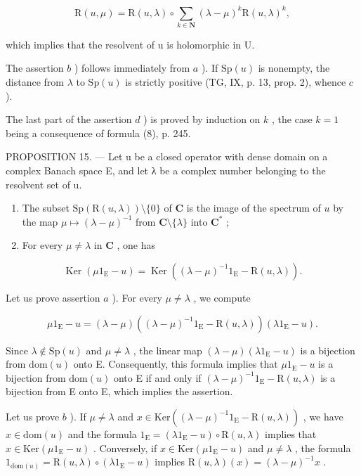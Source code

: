 \[
\mathrm{R} (u, \mu) = \mathrm{R} (u, \lambda) \circ \sum_ {k \in \mathbf {N}} (\lambda - \mu) ^ {k} \mathrm{R} (u, \lambda) ^ {k},
\]

which implies that the resolvent of u is holomorphic in U.

The assertion \(b\) ) follows immediately from \(a\) ). If \(\mathrm{Sp}(u)\) is nonempty, the distance from \(\lambda\) to \(\mathrm{Sp}(u)\) is strictly positive (TG, IX, p. 13, prop. 2), whence \(c\) ).

The last part of the assertion \(d\) ) is proved by induction on \(k\) , the case \(k = 1\) being a consequence of formula (8), p. 245.

PROPOSITION 15. --- Let u be a closed operator with dense domain on a complex Banach space E, and let λ be a complex number belonging to the resolvent set of u.

\begin{enumerate}
\def\labelenumi{\alph{enumi})}
\item
  The subset \(\mathrm{Sp}(\mathrm{R}(u,\lambda)) \setminus \{0\}\) of \(\mathbf{C}\) is the image of the spectrum of \(u\) by the map \(\mu \mapsto (\lambda -\mu)^{-1}\) from \(\mathbf{C} \setminus \{\lambda \}\) into \(\mathbf{C}^*\) ;
\item
  For every \(\mu \neq \lambda\) in \(\mathbf{C}\) , one has
\end{enumerate}

\[
\operatorname{Ker} \left(\mu 1 _ {\mathrm{E}} - u\right) = \operatorname{Ker} \left(\left(\lambda - \mu\right) ^ {- 1} 1 _ {\mathrm{E}} - \mathrm{R} (u, \lambda)\right).
\]

Let us prove assertion \(a\) ). For every \(\mu \neq \lambda\) , we compute

\[
\mu 1 _ {\mathrm{E}} - u = (\lambda - \mu) ((\lambda - \mu) ^ {- 1} 1 _ {\mathrm{E}} - \mathrm{R} (u, \lambda)) (\lambda 1 _ {\mathrm{E}} - u).
\]

Since \(\lambda \notin \mathrm{Sp}(u)\) and \(\mu \neq \lambda\) , the linear map \((\lambda - \mu)(\lambda 1_{\mathrm{E}} - u)\) is a bijection from \(\mathrm{dom}(u)\) onto E. Consequently, this formula implies that \(\mu 1_{\mathrm{E}} - u\) is a bijection from \(\mathrm{dom}(u)\) onto E if and only if \((\lambda - \mu)^{-1} 1_{\mathrm{E}} - \mathrm{R}(u, \lambda)\) is a bijection from E onto E, which implies the assertion.

Let us prove \(b\) ). If \(\mu \neq \lambda\) and \(x \in \mathrm{Ker}((\lambda - \mu)^{-1}1_{\mathrm{E}} - \mathrm{R}(u, \lambda))\) , we have \(x \in \mathrm{dom}(u)\) and the formula \(1_{\mathrm{E}} = (\lambda 1_{\mathrm{E}} - u) \circ \mathrm{R}(u, \lambda)\) implies that \(x \in \mathrm{Ker}(\mu 1_{\mathrm{E}} - u)\) . Conversely, if \(x \in \mathrm{Ker}(\mu 1_{\mathrm{E}} - u)\) and \(\mu \neq \lambda\) , the formula \(1_{\mathrm{dom}(u)} = \mathrm{R}(u, \lambda) \circ (\lambda 1_{\mathrm{E}} - u)\) implies \(\mathrm{R}(u, \lambda)(x) = (\lambda - \mu)^{-1}x\) .

